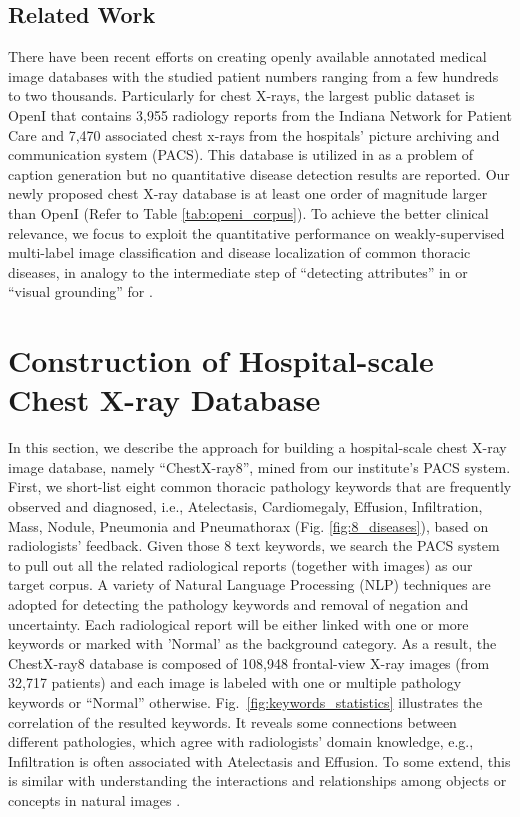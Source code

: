 \documentclass[10pt,twocolumn,letterpaper]{article}
\begin{document}
\subsection{Related Work}

There have been recent efforts on creating openly available annotated medical image databases \cite{Jamaludin2016,Yao2016,roth2014new,roth2015deeporgan} with the studied patient numbers ranging from a few hundreds to two thousands. Particularly for chest X-rays, the largest public dataset is OpenI \cite{openi} that contains
3,955 radiology reports from the Indiana Network for Patient Care and 7,470 associated chest x-rays from the hospitals’ picture archiving and communication system (PACS). This database is utilized in \cite{Shin2016Learning} as a problem of caption generation but no quantitative disease detection results are reported. Our newly proposed chest X-ray database is at least one order of magnitude larger than OpenI \cite{openi} (Refer to Table \ref{tab:openi_corpus}). To achieve the better clinical relevance, we focus to exploit the quantitative performance on weakly-supervised multi-label image classification and disease localization of common thoracic diseases, in analogy to the intermediate step of ``detecting attributes'' in \cite{Wu2016Ask} or ``visual grounding'' for \cite{Plummer2015Flickr30k,Zhu2016Visual7W,Johnson2016DenseCap}.



\section{Construction of Hospital-scale Chest X-ray Database}

In this section, we describe the approach for building a hospital-scale chest X-ray image database, namely ``ChestX-ray8'', mined from our institute's PACS system. First, we short-list eight common thoracic pathology keywords that are frequently observed and diagnosed, i.e., Atelectasis, Cardiomegaly, Effusion, Infiltration, Mass, Nodule, Pneumonia and Pneumathorax (Fig. \ref{fig:8_diseases}), based on radiologists' feedback. Given those 8 text keywords, we search the PACS system to pull out all the related radiological reports (together with images) as our target corpus. A variety of Natural Language Processing (NLP) techniques are adopted for detecting the pathology keywords and removal of negation and uncertainty. Each radiological report will be either linked with one or more keywords or marked with 'Normal' as the background category. As a result, the ChestX-ray8 database is composed of 108,948 frontal-view X-ray images (from 32,717 patients) and each image is labeled with one or multiple pathology keywords or ``Normal'' otherwise. Fig.~\ref{fig:keywords_statistics} illustrates the correlation of the resulted keywords. It reveals some connections between different pathologies, which agree with radiologists' domain knowledge, e.g., Infiltration is often associated with Atelectasis and Effusion. To some extend, this is similar with understanding the interactions and relationships among objects or concepts in natural images \cite{krishnavisualgenome}. 
\end{document}
